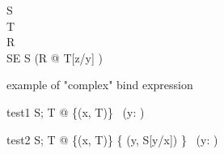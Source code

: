 \begin{zed}
   S 
\\
   T 
\\
   R 
\\
   SE  S \lor (\exists \Delta R @ T[z/y] \land [ a, a': \nat | a = z \land a' = z' ])
\end{zed}

example of "complex" bind expression

\begin{theorem}{test1}
  \forall S; T @ \{(x, \theta T)\} \in \power~(\nat \cross \lblot y: \nat \rblot)
\end{theorem}

\begin{theorem}{test2}
  \forall S; T @ \{(x, \theta T)\} \cup \{ (y, \theta S[y/x]) \} \in \power~(\nat \cross \lblot y: \nat \rblot)
\end{theorem}